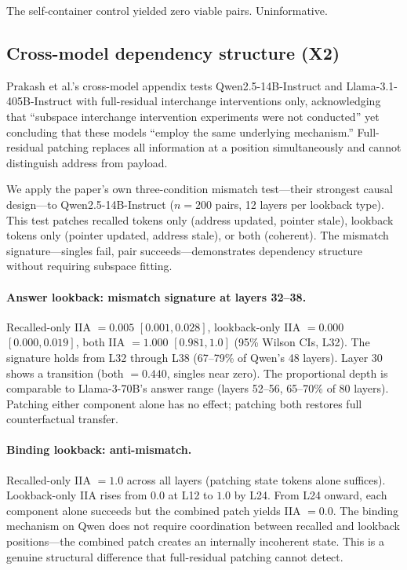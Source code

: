 \documentclass{article}
\begin{document}
The self-container control yielded zero viable pairs. Uninformative.

\subsection{Cross-model dependency structure (X2)}
\label{sec:crossmodel}

Prakash et al.'s cross-model appendix tests Qwen2.5-14B-Instruct and Llama-3.1-405B-Instruct with full-residual interchange interventions only, acknowledging that ``subspace interchange intervention experiments were not conducted'' yet concluding that these models ``employ the same underlying mechanism.'' Full-residual patching replaces all information at a position simultaneously and cannot distinguish address from payload.

We apply the paper's own three-condition mismatch test---their strongest causal design---to Qwen2.5-14B-Instruct ($n = 200$ pairs, 12 layers per lookback type). This test patches recalled tokens only (address updated, pointer stale), lookback tokens only (pointer updated, address stale), or both (coherent). The mismatch signature---singles fail, pair succeeds---demonstrates dependency structure without requiring subspace fitting.

\paragraph{Answer lookback: mismatch signature at layers 32--38.}
Recalled-only IIA $= 0.005$ $[0.001, 0.028]$, lookback-only IIA $= 0.000$ $[0.000, 0.019]$, both IIA $= 1.000$ $[0.981, 1.0]$ (95\% Wilson CIs, L32). The signature holds from L32 through L38 (67--79\% of Qwen's 48 layers). Layer 30 shows a transition (both $= 0.440$, singles near zero). The proportional depth is comparable to Llama-3-70B's answer range (layers 52--56, 65--70\% of 80 layers). Patching either component alone has no effect; patching both restores full counterfactual transfer.

\paragraph{Binding lookback: anti-mismatch.}
Recalled-only IIA $= 1.0$ across all layers (patching state tokens alone suffices). Lookback-only IIA rises from $0.0$ at L12 to $1.0$ by L24. From L24 onward, each component alone succeeds but the combined patch yields IIA $= 0.0$. The binding mechanism on Qwen does not require coordination between recalled and lookback positions---the combined patch creates an internally incoherent state. This is a genuine structural difference that full-residual patching cannot detect.
\end{document}
